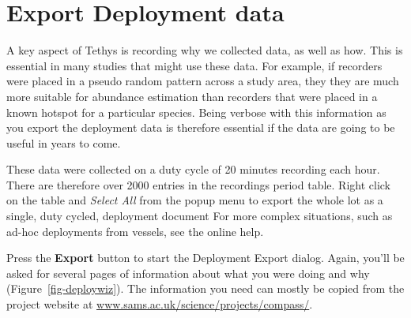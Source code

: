 \documentclass[
]{article}
\begin{document}
\section{Export Deployment data}\label{sec-deployments}

A key aspect of Tethys is recording why we collected data, as well as
how. This is essential in many studies that might use these data. For
example, if recorders were placed in a pseudo random pattern across a
study area, they they are much more suitable for abundance estimation
than recorders that were placed in a known hotspot for a particular
species. Being verbose with this information as you export the
deployment data is therefore essential if the data are going to be
useful in years to come.

These data were collected on a duty cycle of 20 minutes recording each
hour. There are therefore over 2000 entries in the recordings period
table. Right click on the table and \emph{Select All} from the popup
menu to export the whole lot as a single, duty cycled, deployment
document For more complex situations, such as ad-hoc deployments from
vessels, see the online help.

Press the \textbf{Export} button to start the Deployment Export dialog.
Again, you'll be asked for several pages of information about what you
were doing and why (Figure~\ref{fig-deploywiz}). The information you
need can mostly be copied from the project website at
\href{https://www.sams.ac.uk/science/projects/compass/}{www.sams.ac.uk/science/projects/compass/}.
\end{document}
